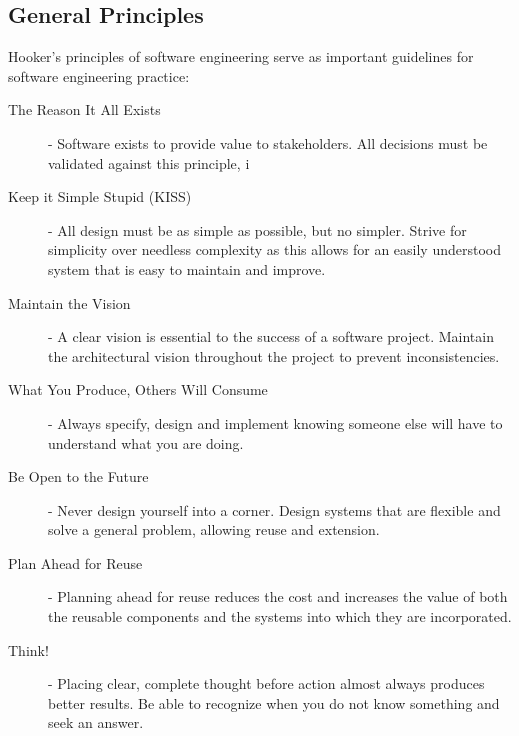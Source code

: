 \documentclass[12pt letter]{report}
\begin{document}
\subsection{General Principles}
Hooker's principles of software engineering serve as important guidelines for software engineering practice:
\begin{description}
  \item[The Reason It All Exists]  - Software exists to provide value to stakeholders. All decisions must be validated against this principle, i
  \item[Keep it Simple Stupid (KISS)] - All design must be as simple as possible, but no simpler. Strive for simplicity over needless complexity as this allows for an easily understood system that is easy to maintain and improve.
  \item[Maintain the Vision] - A clear vision is essential to the success of a software project. Maintain the architectural vision throughout the project to prevent inconsistencies.
  \item[What You Produce, Others Will Consume] - Always specify, design and implement knowing someone else will have to understand what you are doing.
  \item[Be Open to the Future] - Never design yourself into a corner. Design systems that are flexible and solve a general problem, allowing reuse and extension.
  \item[Plan Ahead for Reuse] - Planning ahead for reuse reduces the cost and increases the value of both the reusable components and the systems into which they are incorporated.
  \item[Think!] - Placing clear, complete thought before action almost always produces better results. Be able to recognize when you do not know something and seek an answer.

\end{description}
\end{document}
